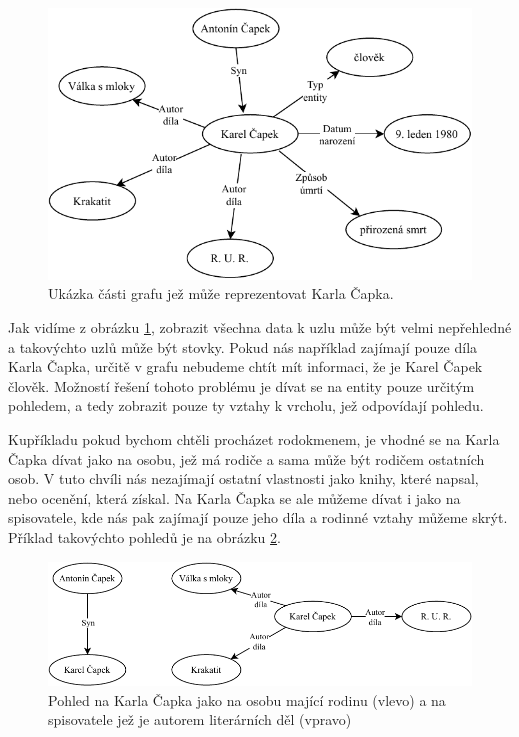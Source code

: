 \begin{figure}[h]
    \centering
    \includegraphics{media/capek-full.pdf}
    \caption{Ukázka části grafu jež může reprezentovat Karla Čapka.}
    \label{fig:capek-full}
\end{figure}

Jak vidíme z obrázku \ref{fig:capek-full}, zobrazit všechna data k uzlu může být velmi nepřehledné a takovýchto uzlů může být stovky. Pokud nás například zajímají pouze díla Karla Čapka, určitě v grafu nebudeme chtít mít informaci, že je Karel Čapek člověk. Možností řešení tohoto problému je dívat se na entity pouze určitým pohledem, a tedy zobrazit pouze ty vztahy k vrcholu, jež odpovídají pohledu.

Kupříkladu pokud bychom chtěli procházet rodokmenem, je vhodné se na Karla Čapka dívat jako na osobu, jež má rodiče a sama může být rodičem ostatních osob. V tuto chvíli nás nezajímají ostatní vlastnosti jako knihy, které napsal, nebo ocenění, která získal. Na Karla Čapka se ale můžeme dívat i jako na spisovatele, kde nás pak zajímají pouze jeho díla a rodinné vztahy můžeme skrýt. Příklad takovýchto pohledů je na obrázku \ref{fig:capek-part}.

\begin{figure}[h]
    \centering
    \includegraphics{media/capek-part.pdf}
    \caption{Pohled na Karla Čapka jako na osobu mající rodinu (vlevo) a na spisovatele jež je autorem literárních děl (vpravo)}
    \label{fig:capek-part}
\end{figure}

